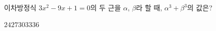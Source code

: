 이차방정식 $3x^2-9x+1=0$의 두 근을 $\alpha$, $\beta$라 할 때, $\alpha^3+\beta^3$의 값은?
\begin{choices32}{$24$}{$27$}{$30$}{$33$}{$36$}\end{choices32}
